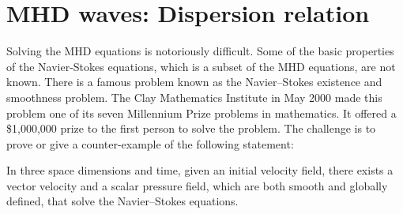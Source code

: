 
\section{MHD waves: Dispersion relation}
\label{sec:mhd_waves_dispersion_relation}

Solving the MHD equations is notoriously difficult. Some of the basic properties of the Navier-Stokes equations, which is a subset of the MHD equations, are not known. There is a famous problem known as the Navier–Stokes existence and smoothness problem. The Clay Mathematics Institute in May 2000 made this problem one of its seven Millennium Prize problems in mathematics. It offered a \$1,000,000 prize to the first person to solve the problem. The challenge is to prove or give a counter-example of the following statement:
\begin{displayquote}
In three space dimensions and time, given an initial velocity field, there exists a vector velocity and a scalar pressure field, which are both smooth and globally defined, that solve the Navier–Stokes equations.
\end{displayquote}

